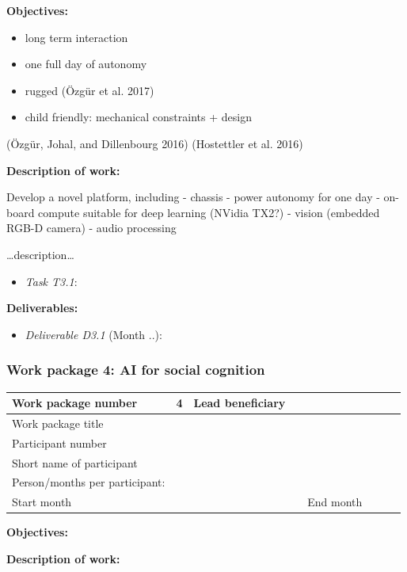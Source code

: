 \documentclass[]{article}
\begin{document}
\textbf{Objectives:}

\begin{itemize}

\item
  long term interaction
\item
  one full day of autonomy
\item
  rugged (Özgür et al. 2017)
\item
  child friendly: mechanical constraints + design
\end{itemize}

(Özgür, Johal, and Dillenbourg 2016) (Hostettler et al. 2016)

\textbf{Description of work:}

Develop a novel platform, including - chassis - power autonomy for one
day - on-board compute suitable for deep learning (NVidia TX2?) - vision
(embedded RGB-D camera) - audio processing

\ldots{}description\ldots{}

\begin{itemize}

\item
  \emph{Task T3.1}:
\end{itemize}

\textbf{Deliverables:}

\begin{itemize}

\item
  \emph{Deliverable D3.1} (Month ..):
\end{itemize}

\subsubsection{Work package 4: AI for social cognition}\label{work-package-4-ai-for-social-cognition}

\begin{longtable}[]{@{}llllllll@{}}
\toprule
Work package number & 4 & Lead beneficiary & & & & &\tabularnewline
\midrule
\endhead
Work package title & & & & & & &\tabularnewline
Participant number & & & & & & &\tabularnewline
Short name of participant & & & & & & &\tabularnewline
Person/months per participant: & & & & & & &\tabularnewline
Start month & & & & End month & & &\tabularnewline
\bottomrule
\end{longtable}

\textbf{Objectives:}

\textbf{Description of work:}
\end{document}
